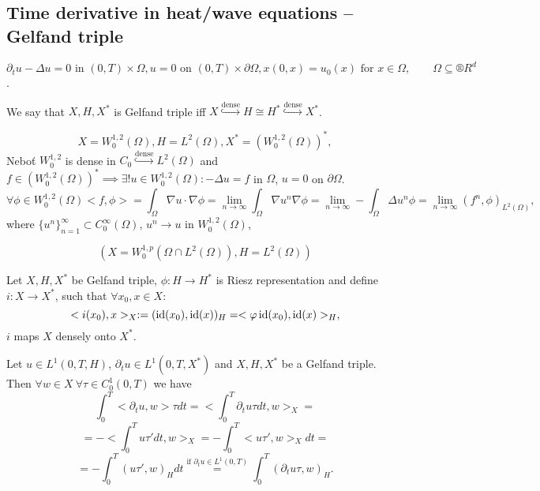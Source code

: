 \documentclass[12pt]{article}					%
\begin{document}
\subsection{Time derivative in heat/wave equations – Gelfand triple}
\begin{poznamka}[Motivation]
	$$ \partial_t u - \Delta u = 0 \text{ in } (0, T) \times \Omega, u = 0 \text{ on } (0, T)\times \partial \Omega, x(0, x) = u_0(x) \text{ for } x \in \Omega, \qquad \Omega \subseteq ®R^d $$.
\end{poznamka}

\begin{definice}
	We say that $X, H, X^*$ is Gelfand triple iff $X \overset{\text{dense}}\hookrightarrow H \cong H^* \overset{\text{dense}}\hookrightarrow X^*$.

	\begin{prikladyin}
		$$ X = W_0^{1, 2}(\Omega), H = L^2(\Omega), X^* = (W_0^{1, 2}(\Omega))^*, $$
		Neboť $W_0^{1, 2}$ is dense in $C_0 \overset{\text{dense}}\hookrightarrow L^2(\Omega)$ and $f \in (W_0^{1, 2}(\Omega))^* \implies \exists! u \in W_0^{1, 2}(\Omega): -\Delta u = f$ in $\Omega$, $u = 0$ on $\partial \Omega$.
		$$ \forall \phi \in W_0^{1, 2}(\Omega) <f, \phi> = \int_\Omega \nabla u · \nabla \phi = \lim_{n \rightarrow ∞} \int_\Omega \nabla u^n \nabla \phi = \lim_{n \rightarrow ∞} - \int_\Omega \Delta u^n \phi = \lim_{n \rightarrow ∞} (f^n, \phi)_{L^2(\Omega)}, $$
		where $\{u^n\}_{n=1}^∞ \subset C_0^∞(\Omega)$, $u^n \rightarrow u$ in $W_0^{1, 2}(\Omega)$,

		$$ (X = W_0^{1, p}(\Omega \cap L^2(\Omega)), H = L^2(\Omega)) $$
	\end{prikladyin}
\end{definice}

\begin{definice}
	Let $X, H, X^*$ be Gelfand triple, $\phi: H \rightarrow H^*$ is Riesz representation and define $i: X \rightarrow X^*$, such that $\forall x_0, x \in X$:
	$$ <i(x_0), x>_X := (\operatorname{id}(x_0), \operatorname{id}(x))_H = <\varphi \operatorname{id}(x_0), \operatorname{id}(x)>_H, $$
	$i$ maps $X$ densely onto $X^*$.
\end{definice}

\begin{lemma}
	Let $u \in L^1(0, T, H)$, $\partial_t u \in L^1(0, T, X^*)$ and $X, H, X^*$ be a Gelfand triple. Then $\forall w \in X\ \forall \tau \in C_0^1(0, T)$ we have
	$$ \int_0^T <\partial_t u, w> \tau dt = <\int_0^T \partial_t u \tau dt, w>_X = $$
	$$ = - <\int_0^T u \tau' dt, w>_X = -\int_0^T <u\tau', w>_X dt = $$
	$$ = -\int_0^T (u \tau', w)_H dt \overset{\text{if } \partial_t u \in L^1(0, T)}= \int_0^T(\partial_t u \tau, w)_H. $$
\end{lemma}
\end{document}
